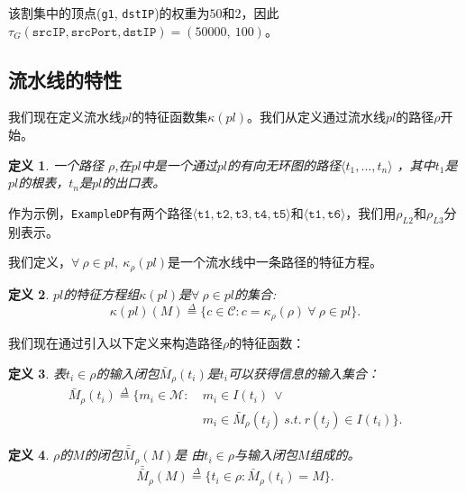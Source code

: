 \documentclass{ctexart}
\newcommand{\exampledp}{\texttt{ExampleDP}}
\newtheorem{definition}{定义}
\begin{document}
该割集中的顶点(\texttt{g1}, \texttt{dstIP})的权重为$50$和$2$，因此$\tau_G(\texttt{srcIP}, \texttt{srcPort}, \texttt{dstIP}) = (50000,\ 100)$。



\subsection{流水线的特性}
我们现在定义流水线$pl$的特征函数集$\kappa(pl)$。我们从定义通过流水线$pl$的路径$\rho$开始。


\begin{definition}
一个路径 $\rho$,在$pl$中是一个通过$pl$的有向无环图的路径$\langle t_1, ..., t_n \rangle$ ，其中$t_1$是$pl$的根表，$t_n$是$pl$的出口表。

\end{definition}

作为示例，\exampledp 有两个路径$\langle \texttt{t1}, \texttt{t2}, \texttt{t3}, \texttt{t4}, \texttt{t5} \rangle$和$\langle \texttt{t1}, \texttt{t6} \rangle$，我们用$\rho_{L2}$和$\rho_{L3}$分别表示。

我们定义，$\forall\ \rho \in pl,\ \kappa_\rho(pl)$是一个流水线中一条路径的特征方程。


\begin{definition} $pl$的特征方程组$\kappa(pl)$是$\forall\ \rho \in pl$的集合:
\begin{equation*}
\kappa(pl)(M) \overset{\Delta}{=} \{c \in \mathcal{C} : c = \kappa_\rho(\rho)\ \forall\ \rho \in pl\}.
\end{equation*}
\end{definition}

我们现在通过引入以下定义来构造路径$\rho$的特征函数：

\begin{definition} 表$t_i \in \rho$的{\em 输入闭包$\bar{M}_\rho(t_i)$}是$t_i$可以获得信息的输入集合：
\begin{equation*}
\begin{split}
\bar{M}_\rho(t_i) \overset{\Delta}{=} \{m_i \in \mathcal{M} :\ &m_i \in I(t_i)\ \vee\\ &m_i \in \bar{M}_\rho(t_j)\ s.t.\ r(t_j) \in I(t_i)\}.
\end{split}
\end{equation*}
\end{definition}

\begin{definition} $\rho$的$M$的{\em 闭包$\bar{\bar{M}}_\rho(M)$}是 由$t_i \in \rho$与输入闭包$M$组成的。
\begin{equation*}
\bar{\bar{M}}_\rho(M) \overset{\Delta}{=} \{t_i \in \rho : \bar{M}_\rho(t_i) = M\}. 
\end{equation*}
\end{definition}
\end{document}
